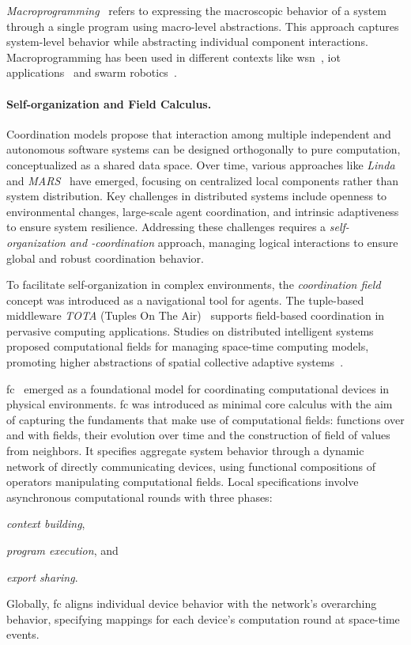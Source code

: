 \documentclass[12pt, a4paper]{article}
\newenvironment{inlinelist}{\begin{enumerate*}[label=\emph{(\roman*)}]}{\end{enumerate*}}
\begin{document}
\emph{Macroprogramming}~\cite{casadei2023} refers
to expressing the macroscopic behavior of a system through a single program using
macro-level abstractions.
%
This approach captures system-level behavior while abstracting individual component interactions.
%
Macroprogramming has been used in different contexts like \ac{wsn}~\cite{1440891}, \ac{iot} applications~\cite{noor19,mizzi18} and swarm robotics~\cite{buzz}.

\sloppypar
\paragraph{Self-organization and Field Calculus.}

Coordination models propose that interaction among multiple independent and autonomous software systems can be designed
orthogonally to pure computation, conceptualized as a shared data space.
%
Over time,
various approaches like \textit{Linda}~\cite{ViroliCoordination2012} and \textit{MARS}~\cite{mars} have emerged,
focusing on centralized local components rather than system distribution.
%
Key challenges in distributed systems include openness to environmental changes, large-scale agent coordination,
and intrinsic adaptiveness to ensure system resilience.
%
Addressing these challenges requires a \emph{self-organization and -coordination} approach,
managing logical interactions to
ensure global and robust coordination behavior.

To facilitate self-organization in complex environments, the \emph{coordination field} concept was introduced as a
navigational tool for agents.
%
The tuple-based middleware \textit{TOTA} (Tuples On The Air)~\cite{tota} supports field-based coordination in pervasive
computing applications.
%
Studies on distributed intelligent systems proposed computational fields for managing space-time
computing models, promoting higher abstractions of spatial collective adaptive systems~\cite{JLAMP2019}.

\ac{fc}~\cite{TOCL2019} emerged as a foundational model for coordinating computational devices in physical environments.
%
\ac{fc} was introduced as minimal core calculus with the aim of capturing the fundaments that make use of computational fields:
functions over and with fields, their evolution over time and the construction of field of values from neighbors.
%
It specifies aggregate system behavior through a dynamic network of directly communicating devices,
using functional compositions of operators manipulating computational fields.
%
Local specifications involve asynchronous computational rounds with three phases:
\begin{inlinelist}
    \item \emph{context building},
    \item \emph{program execution}, and
    \item \emph{export sharing}.
\end{inlinelist}
%
Globally,
\ac{fc} aligns individual device behavior with the network's overarching behavior,
specifying mappings for each device's computation round at space-time events.
\end{document}
